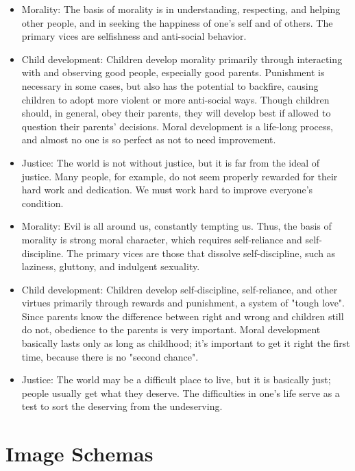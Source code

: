 \documentclass[headrule,footrule]{foils}
\begin{document}
\begin{itemize}
\item     Morality: The basis of morality is in understanding, respecting, and helping other people, and in seeking the happiness of one's self and of others. The primary vices are selfishness and anti-social behavior.
\item   Child development: Children develop morality primarily through interacting with and observing good people, especially good parents. Punishment is necessary in some cases, but also has the potential to backfire, causing children to adopt more violent or more anti-social ways. Though children should, in general, obey their parents, they will develop best if allowed to question their parents' decisions. Moral development is a life-long process, and almost no one is so perfect as not to need improvement.
\item     Justice: The world is not without justice, but it is far from the ideal of justice. Many people, for example, do not seem properly rewarded for their hard work and dedication. We must work hard to improve everyone's condition.
\end{itemize}


\begin{itemize}
\item     Morality: Evil is all around us, constantly tempting us. Thus, the basis of morality is strong moral character, which requires self-reliance and self-discipline. The primary vices are those that dissolve self-discipline, such as laziness, gluttony, and indulgent sexuality.
\item     Child development: Children develop self-discipline, self-reliance, and other virtues primarily through rewards and punishment, a system of "tough love". Since parents know the difference between right and wrong and children still do not, obedience to the parents is very important. Moral development basically lasts only as long as childhood; it's important to get it right the first time, because there is no "second chance".
\item 
    Justice: The world may be a difficult place to live, but it is basically just; people usually get what they deserve. The difficulties in one's life serve as a test to sort the deserving from the undeserving.

\end{itemize}

\section{Image Schemas}
\end{document}
